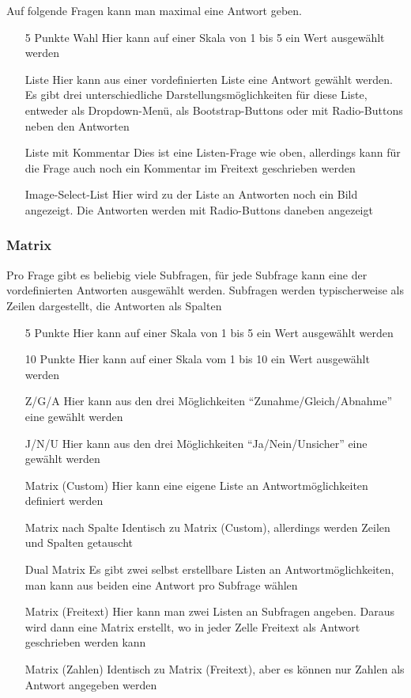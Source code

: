 Auf folgende Fragen kann man maximal eine Antwort geben.
\begin{itemize}
	\item[5 Punkte Wahl] Hier kann auf einer Skala von 1 bis 5 ein Wert ausgewählt werden
	\item[Liste] Hier kann aus einer vordefinierten Liste eine Antwort gewählt werden. Es gibt drei unterschiedliche Darstellungsmöglichkeiten für diese Liste, entweder als Dropdown-Menü, als Bootstrap-Buttons oder mit Radio-Buttons neben den Antworten
	\item[Liste mit Kommentar] Dies ist eine Listen-Frage wie oben, allerdings kann für die Frage auch noch ein Kommentar im Freitext geschrieben werden
	\item[Image-Select-List] Hier wird zu der Liste an Antworten noch ein Bild angezeigt. Die Antworten werden mit Radio-Buttons daneben angezeigt
\end{itemize}

\subsubsection{Matrix}


Pro Frage gibt es beliebig viele Subfragen, für jede Subfrage kann eine der vordefinierten Antworten ausgewählt werden.
Subfragen werden typischerweise als Zeilen dargestellt, die Antworten als Spalten

\begin{itemize}
	\item[5 Punkte] Hier kann auf einer Skala von 1 bis 5 ein Wert ausgewählt werden
	\item[10 Punkte] Hier kann auf einer Skala vom 1 bis 10 ein Wert ausgewählt werden
	\item[Z/G/A] Hier kann aus den drei Möglichkeiten \enquote{Zunahme/Gleich/Abnahme} eine gewählt werden
	\item[J/N/U] Hier kann aus den drei Möglichkeiten \enquote{Ja/Nein/Unsicher} eine gewählt werden
	\item[Matrix (Custom)] Hier kann eine eigene Liste an Antwortmöglichkeiten definiert werden
	\item[Matrix nach Spalte] Identisch zu Matrix (Custom), allerdings werden Zeilen und Spalten getauscht
	\item[Dual Matrix] Es gibt zwei selbst erstellbare Listen an Antwortmöglichkeiten, man kann aus beiden eine Antwort pro Subfrage wählen
	\item[Matrix (Freitext)] Hier kann man zwei Listen an Subfragen angeben. Daraus wird dann eine Matrix erstellt, wo in jeder Zelle Freitext als Antwort geschrieben werden kann
	\item[Matrix (Zahlen)] Identisch zu Matrix (Freitext), aber es können nur Zahlen als Antwort angegeben werden
\end{itemize}

